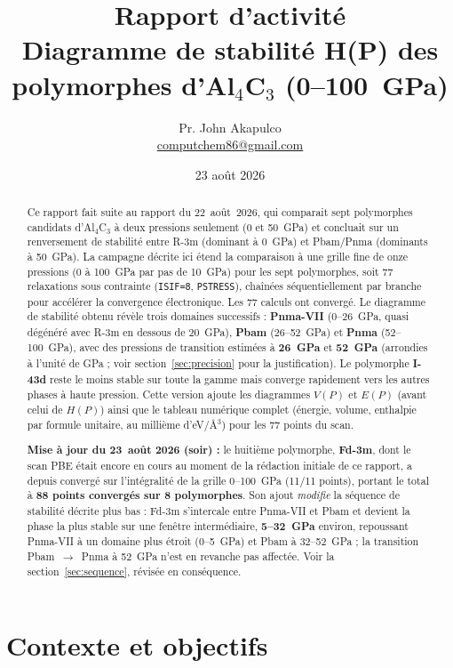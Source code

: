\documentclass[11pt,a4paper]{article}
\title{\vspace{-1.5cm}Rapport d'activité\\[2pt]
\large Diagramme de stabilité H(P) des polymorphes d'Al$_4$C$_3$ (0--100~GPa)}
\author{Pr. John Akapulco \\ \small \href{mailto:computchem86@gmail.com}{computchem86@gmail.com}}
\date{23 août 2026}
\begin{document}
\maketitle
\vspace{-0.5cm}

\begin{abstract}
\noindent
Ce rapport fait suite au rapport du 22~août~2026, qui comparait sept polymorphes candidats
d'Al$_4$C$_3$ à deux pressions seulement (0 et 50~GPa) et concluait sur un renversement de
stabilité entre R-3m (dominant à 0~GPa) et Pbam/Pnma (dominants à 50~GPa). La campagne décrite
ici étend la comparaison à une grille fine de onze pressions (0 à 100~GPa par pas de 10~GPa)
pour les sept polymorphes, soit 77 relaxations sous contrainte (\texttt{ISIF=8},
\texttt{PSTRESS}), chaînées séquentiellement par branche pour accélérer la convergence
électronique. Les 77 calculs ont convergé. Le diagramme de stabilité obtenu révèle trois
domaines successifs : \textbf{Pnma-VII} (0--26~GPa, quasi dégénéré avec R-3m en dessous de
20~GPa), \textbf{Pbam} (26--52~GPa) et \textbf{Pnma} (52--100~GPa), avec des pressions de
transition estimées à \textbf{26~GPa} et \textbf{52~GPa} (arrondies à l'unité de GPa ; voir
section~\ref{sec:precision} pour la justification). Le polymorphe \textbf{I-43d}
reste le moins stable sur toute la gamme mais converge rapidement vers les autres phases à
haute pression. Cette version ajoute les diagrammes $V(P)$ et $E(P)$ (avant celui de $H(P)$)
ainsi que le tableau numérique complet (énergie, volume, enthalpie par formule unitaire, au
millième d'eV/\AA$^3$) pour les 77 points du scan.

\medskip
\noindent\textbf{Mise à jour du 23~août 2026 (soir) :} le huitième polymorphe, \textbf{Fd-3m},
dont le scan PBE était encore en cours au moment de la rédaction initiale de ce rapport, a
depuis convergé sur l'intégralité de la grille 0--100~GPa (11/11 points), portant le total à
\textbf{88 points convergés sur 8 polymorphes}. Son ajout \emph{modifie} la séquence de
stabilité décrite plus bas : Fd-3m s'intercale entre Pnma-VII et Pbam et devient la phase la
plus stable sur une fenêtre intermédiaire, \textbf{5--32~GPa} environ, repoussant Pnma-VII à un
domaine plus étroit (0--5~GPa) et Pbam à 32--52~GPa ; la transition Pbam~$\to$~Pnma à 52~GPa
n'est en revanche pas affectée. Voir la section~\ref{sec:sequence}, révisée en conséquence.
\end{abstract}

\section{Contexte et objectifs}
\end{document}
